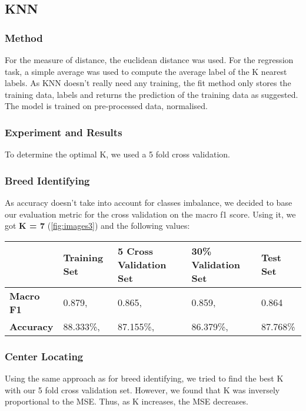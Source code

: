 \subsection{KNN}


\subsubsection{Method}
For the measure of distance, the euclidean distance was used. For the regression task, a simple average was used to compute the average label of the K nearest labels. As KNN doesn't really need any training, the fit method only stores the training data, labels and returns the prediction of the training data as suggested. The model is trained on pre-processed data, normalised.


\subsubsection{Experiment and Results}
To determine the optimal K, we used a 5 fold cross validation.

\subsubsection{Breed Identifying}
As accuracy doesn't take into account for classes imbalance, we decided to base our evaluation metric for the cross validation on the macro f1 score. Using it, we got \textbf{K = 7} (\cref{fig:images3}) and the following values:
\\

\begin{center}
  \begin{tabular}{l l l l l}
    \hline
    & \textbf{Training Set} & \textbf{5 Cross Validation Set} & \textbf{30\% Validation Set} & \textbf{Test Set}\\ 
    \hline 
    \textbf{Macro F1} & 0.879, & 0.865, & 0.859, & 0.864 \\
    \hline 
    \textbf{Accuracy} & 88.333\%, & 87.155\%, & 86.379\%, & 87.768\% \\
    \hline 
    \end{tabular}
    \label{tab:macro_f1_accuracy}
\end{center}

\subsubsection{Center Locating}
Using the same approach as for breed identifying, we tried to find the best K with our 5 fold cross validation set. However, we found that K was inversely proportional to the MSE. Thus, as K increases, the MSE decreases.

